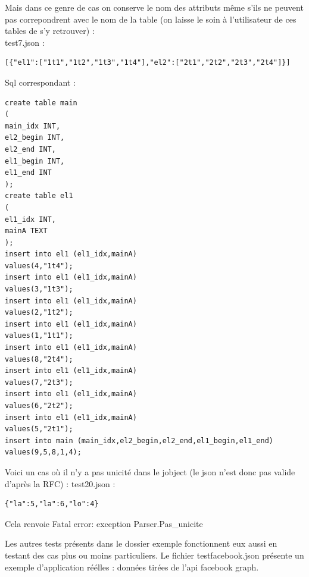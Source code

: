 \documentclass{report}
\begin{document}
Mais dans ce genre de cas on conserve le nom des attributs même s'ils ne peuvent pas correpondrent avec le nom de la table (on laisse le soin à l'utilisateur de ces tables de s'y retrouver) :\\
test7.json :
\\
\begin{verbatim}
[{"el1":["1t1","1t2","1t3","1t4"],"el2":["2t1","2t2","2t3","2t4"]}]
\end{verbatim}

Sql correspondant :
\\
\begin{verbatim}
create table main
(
main_idx INT,
el2_begin INT,
el2_end INT,
el1_begin INT,
el1_end INT
);
create table el1
(
el1_idx INT,
mainA TEXT
);
insert into el1 (el1_idx,mainA)
values(4,"1t4");
insert into el1 (el1_idx,mainA)
values(3,"1t3");
insert into el1 (el1_idx,mainA)
values(2,"1t2");
insert into el1 (el1_idx,mainA)
values(1,"1t1");
insert into el1 (el1_idx,mainA)
values(8,"2t4");
insert into el1 (el1_idx,mainA)
values(7,"2t3");
insert into el1 (el1_idx,mainA)
values(6,"2t2");
insert into el1 (el1_idx,mainA)
values(5,"2t1");
insert into main (main_idx,el2_begin,el2_end,el1_begin,el1_end)
values(9,5,8,1,4);
\end{verbatim}

Voici un cas où il n'y a pas unicité dans le jobject (le json n'est donc pas valide d'après la RFC) :
test20.json :
\\
\begin{verbatim}
{"la":5,"la":6,"lo":4}
\end{verbatim}
Cela renvoie Fatal error: exception Parser.Pas\_unicite

Les autres tests présents dans le dossier exemple fonctionnent eux aussi en testant des cas plus ou moins particuliers. Le fichier testfacebook.json présente un exemple d'application réélles : données tirées de l'api facebook graph.
\end{document}
